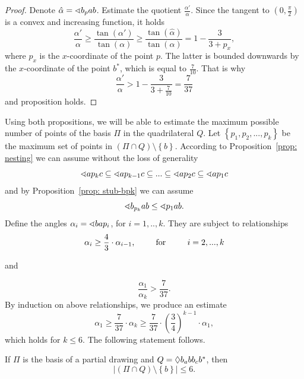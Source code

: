 \begin{proof}
Denote $\hat{\alpha} = \sphericalangle{b_{p}ab}$. Estimate the quotient $\frac{\alpha'}{\alpha}$. Since the tangent to $\left(0, \frac{\pi}{2}\right)$ is a convex and increasing function, it holds
\begin{equation*}
  \frac{\alpha'}{\alpha} \geq \frac{\tan(\alpha')}{\tan(\alpha)} \geq \frac{\tan(\hat{\alpha})}{\tan(\alpha)} = 1 - \frac{3}{3 + p_{x}},
\end{equation*}
where $p_{x}$ is the $x$-coordinate of the point $p$. The latter is bounded downwards by the $x$-coordinate of the point $b^{*}$, which is equal to $\frac{7}{10}$. That is why
\begin{equation*}
  \frac{\alpha'}{\alpha} > 1 - \frac{3}{3 + \frac{7}{10}} = \frac{7}{37}
\end{equation*}
and proposition holds.
\end{proof}

Using both propositions, we will be able to estimate the maximum possible number of points of the basis $\Pi$ in the quadrilateral $Q$. Let $\left\{ p_{1}, p_{2},...,p_{k} \right\}$ be the maximum set of points in $\left(\Pi \cap Q\right) \setminus \left\{ b \right\}$. According to Proposition~\ref{prop: nesting} we can assume without the loss of generality
$$
  \sphericalangle{ap_{k}c} \subseteq \sphericalangle{ap_{k-1}c} \subseteq ... \subseteq \sphericalangle{ap_{2}c} \subseteq \sphericalangle{ap_{1}c}
$$
and by Proposition~\ref{prop: stub-bpk} we can assume
$$
  \sphericalangle{b_{p_{k}}ab} \leq \sphericalangle{p_{1}ab}.
$$
Define the angles $\alpha_{i} = \sphericalangle{bap_{i}}$, for $i = 1,..,k$. They are subject to relationships
\begin{equation}
\label{eq: sequence-alphas-1}
\alpha_{i} \geq \frac{4}{3} \cdot \alpha_{i-1} \text{,\hspace{0.8cm}   for    \hspace{0.8cm}} i = 2,...,k
\end{equation}

and

\begin{equation}
\label{eq: sequence-alphas-2}
\frac{\alpha_{1}}{\alpha_{k}} > \frac{7}{37}.
\end{equation}
By induction on above relationships, we produce an estimate
$$
\alpha_{1} \geq \frac{7}{37}  \cdot  \alpha_{k} \geq \frac{7}{37}  \cdot  \left(\frac{3}{4}\right)^{k-1}  \cdot \alpha_{1},
$$
which holds for $k \leq 6$. The following statement follows.
\begin{proposition}
\label{prop: corner-regions-1}
If $\Pi$ is the basis of a partial drawing and $Q = \Diamond{b_{a}bb_{c}b^{*}}$, then
\begin{equation}
\left|\left(\Pi \cap Q\right) \setminus \left\{ b \right\}\right| \leq 6.
\end{equation}
\end{proposition}

